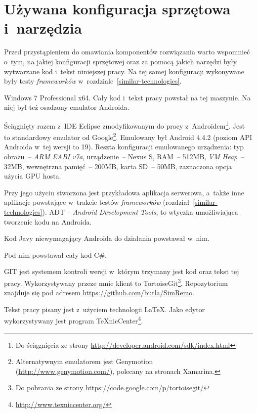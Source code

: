\section{Używana konfiguracja sprzętowa i~narzędzia}
\label{system-configuration}
Przed przystąpieniem do omawiania komponentów rozwiązania warto wspomnieć o~tym, na jakiej konfiguracji sprzętowej oraz za pomocą jakich narzędzi były wytwarzane kod i~tekst niniejszej pracy. Na tej samej konfiguracji wykonywane były testy \emph{frameworków} w~rozdziale~\ref{similar-technologies}.

\begin{description}
Windows 7 Professional x64. Cały kod i~tekst pracy powstał na tej maszynie. Na niej był też osadzony emulator Androida.

Ściągnięty razem z~IDE Eclipse zmodyfikowanym do pracy z~Androidem\footnote{Do ściągnięcia ze strony \url{http://developer.android.com/sdk/index.html}}.
Jest to standardowy emulator od Google\footnote{Alternatywnym emulatorem jest Genymotion (\url{http://www.genymotion.com/}), polecany na stronach Xamarina.}.
Emulowany był Android 4.4.2 (poziom API Androida w~tej wersji to 19). Reszta konfiguracji emulowanego urządzenia: typ obrazu~-- \emph{ARM EABI v7a}, urządzenie~-- Nexus S, RAM~-- 512MB, \emph{VM Heap}~-- 32MB, wewnętrzna pamięć~-- 200MB, karta SD~-- 50MB, zaznaczona opcja użycia GPU hosta.

Przy jego użyciu stworzona jest przykładowa aplikacja serwerowa, a~także inne aplikacje powstające w~trakcie testów \emph{frameworków} (rozdział~\ref{similar-technologies}). ADT -- \emph{Android Development Tools}, to wtyczka umożliwiająca tworzenie kodu na Androida.

Kod Javy niewymagający Androida do działania powstawał w~nim.

Pod nim powstawał cały kod C\#.

GIT jest systemem kontroli wersji w~którym trzymany jest kod oraz tekst tej pracy. Wykorzystywany przeze mnie klient to TortoiseGit\footnote{Do pobrania ze strony \url{https://code.google.com/p/tortoisegit/}}. Repozytorium znajduje się pod adresem \url{https://github.com/butla/SimRemo}.

\itemtitle{\LaTeX}
Tekst pracy pisany jest z~użyciem technologii \LaTeX. Jako edytor wykorzystywany jest program TeXnicCenter\footnote{\url{http://www.texniccenter.org/}}.
\end{description}

